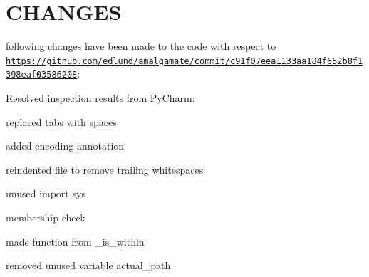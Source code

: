 \chapter{CHANGES }
\hypertarget{md_include_2nlohman_2json-develop_2tools_2amalgamate_2_c_h_a_n_g_e_s}{}\label{md_include_2nlohman_2json-develop_2tools_2amalgamate_2_c_h_a_n_g_e_s}
 following changes have been made to the code with respect to \href{https://github.com/edlund/amalgamate/commit/c91f07eea1133aa184f652b8f1398eaf03586208}{\texttt{https:\+/\+/\+github.\+com/\+edlund/\+amalgamate/\+commit/\+c91f07eea1133aa184f652b8f1398eaf03586208}}:\+


\begin{DoxyItemize}
\item Resolved inspection results from Py\+Charm:\+
\begin{DoxyItemize}
\item replaced tabs with spaces
\item added encoding annotation
\item reindented file to remove trailing whitespaces
\item unused import {\ttfamily sys}
\item membership check
\item made function from {\ttfamily \+\_\+is\+\_\+within}
\item removed unused variable {\ttfamily actual\+\_\+path} 
\end{DoxyItemize}
\end{DoxyItemize}